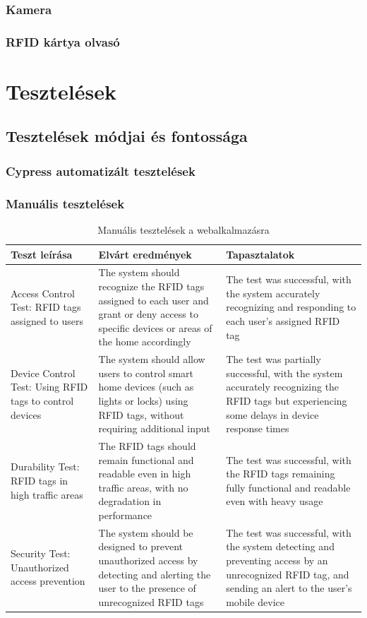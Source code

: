 \documentclass[
]{thesis-ekf}
\theoremstyle{definition}
\theoremstyle{remark}
\begin{document}
	\subsection{Kamera}
	\subsection{RFID kártya olvasó}
	
	
	\chapter{Tesztelések}
	\section{Tesztelések módjai és fontossága}
	
	\subsection{Cypress automatizált tesztelések}
	\subsection{Manuális tesztelések}
	\begin{table}[ht]
		\centering
		\begin{tabular}{|p{6cm}|p{6cm}|p{4cm}|}
			\hline
			\textbf{Teszt leírása} & \textbf{Elvárt eredmények} & \textbf{Tapasztalatok} \\
			\hline
			Access Control Test: RFID tags assigned to users &
			 The system should recognize the RFID tags assigned to each user and grant or deny access to specific devices or areas of the home accordingly &
			  The test was successful, with the system accurately recognizing and responding to each user's assigned RFID tag \\
			\hline
			Device Control Test: Using RFID tags to control devices &
			 The system should allow users to control smart home devices (such as lights or locks) using RFID tags, without requiring additional input &
			  The test was partially successful, with the system accurately recognizing the RFID tags but experiencing some delays in device response times \\
			\hline
			Durability Test: RFID tags in high traffic areas &
			 The RFID tags should remain functional and readable even in high traffic areas, with no degradation in performance &
			  The test was successful, with the RFID tags remaining fully functional and readable even with heavy usage \\
			\hline
			Security Test: Unauthorized access prevention &
			 The system should be designed to prevent unauthorized access by detecting and alerting the user to the presence of unrecognized RFID tags & 
			 The test was successful, with the system detecting and preventing access by an unrecognized RFID tag, and sending an alert to the user's mobile device \\
			\hline
		\end{tabular}
		\caption{Manuális tesztelések a webalkalmazásra}
		\label{table:manual-testing-results}
	\end{table}
	
\end{document}
